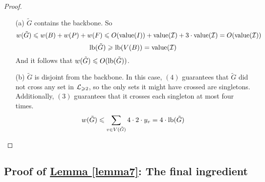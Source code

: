 \documentclass[./main.tex]{subfiles}
\begin{document}
\begin{proof}
			\begin{enumerate}
				\item[(a)] $\tilde{G}$ contains the backbone. So $$w(\tilde{G})\leqslant w(B) + w(P) + w(F)\leqslant O(\textup{value}(I)) + \textup{value}(\mathcal{I}) + 3\cdot\textup{value}(\mathcal{I}) = O(\textup{value}(\mathcal{I}))$$
				      $$\textup{lb}(\tilde{G})\geqslant \textup{lb}(V(B)) = \textup{value}(\mathcal{I})$$
				      And it follows that $w(\tilde{G})\leqslant O(\textup{lb}(\tilde{G}))$.
				\item[(b)] $\tilde{G}$ is disjoint from the backbone. In this case, $(4)$ guarantees that $\tilde{G}$ did not cross any set in $\mathcal{L}_{\geqslant 2}$, so the only sets it might have crossed are singletons. Additionally, $(3)$ guarantees that it crosses each singleton at most four times. $$w(\tilde{G})\leqslant \sum_{v\in V(\tilde{G})}4\cdot 2\cdot y_v = 4\cdot\textup{lb}(\tilde{G})$$
			\end{enumerate}
		\end{proof}
		
		\subsection{Proof of \hyperref[lemma7]{Lemma \ref{lemma7}}: The final ingredient}
\end{document}
